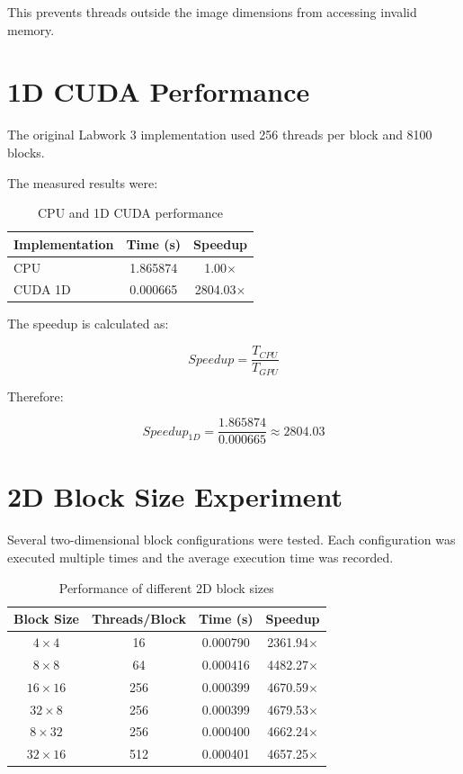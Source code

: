 \documentclass[11pt]{article}
\begin{document}
This prevents threads outside the image dimensions from accessing invalid
memory.

\section{1D CUDA Performance}

The original Labwork 3 implementation used 256 threads per block and
8100 blocks.

The measured results were:

\begin{table}[H]
    \centering
    \caption{CPU and 1D CUDA performance}
    \begin{tabular}{lcc}
        \toprule
        Implementation & Time (s) & Speedup \\
        \midrule
        CPU & 1.865874 & 1.00$\times$ \\
        CUDA 1D & 0.000665 & 2804.03$\times$ \\
        \bottomrule
    \end{tabular}
\end{table}

The speedup is calculated as:

\[
Speedup = \frac{T_{CPU}}{T_{GPU}}
\]

Therefore:

\[
Speedup_{1D}
=
\frac{1.865874}{0.000665}
\approx 2804.03
\]

\section{2D Block Size Experiment}

Several two-dimensional block configurations were tested. Each
configuration was executed multiple times and the average execution time
was recorded.

\begin{table}[H]
    \centering
    \caption{Performance of different 2D block sizes}
    \begin{tabular}{c c c c}
        \toprule
        Block Size & Threads/Block & Time (s) & Speedup \\
        \midrule
        $4\times4$   & 16  & 0.000790 & 2361.94$\times$ \\
        $8\times8$   & 64  & 0.000416 & 4482.27$\times$ \\
        $16\times16$ & 256 & 0.000399 & 4670.59$\times$ \\
        $32\times8$  & 256 & 0.000399 & 4679.53$\times$ \\
        $8\times32$  & 256 & 0.000400 & 4662.24$\times$ \\
        $32\times16$ & 512 & 0.000401 & 4657.25$\times$ \\
        \bottomrule
    \end{tabular}
\end{table}
\end{document}
